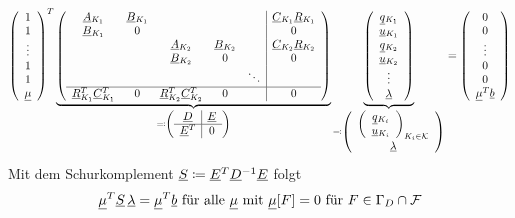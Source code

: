 \begin{align*}
\left(
\begin{array}{c}
1\\ 1 \\ \vdots \\ 1 \\ 1\\ \underline{\mu}{}
\end{array}
\right)^T
\underbrace{\left(
	\begin{array}{ccccc|c}
	\underline{A}{}_{K_1} & \underline{B}{}_{K_1}&&&& \underline{C}{}_{K_1} \underline{R}{}_{K_1}\\
	\underline{B}{}_{K_1} & 0 &&&& 0\\
	&& \underline{A}{}_{K_2} & \underline{B}{}_{K_2} && \underline{C}{}_{K_2} \underline{R}{}_{K_2}\\
	&  & \underline{B}{}_{K_2} & 0 && 0\\
	&  &  &  &\ddots &\\
	\hline
	\underline{R}{}_{K_1}^T \underline{C}{}_{K_1}^T& 0 & \underline{R}{}_{K_2}^T \underline{C}{}_{K_2}^T& 0& &0 \\
	\end{array}
	\right)}_{\eqqcolon \left( \begin{array}{c|c}
	\underline{D}{} & \underline{E}{}\\
	\hline
	\underline{E}{}^T & 0
	\end{array} \right)}
\underbrace{\left(
	\begin{array}{c}
	\underline{q}{}_{K_1}\\ \underline{u}{}_{K_1} \\ \underline{q}{}_{K_2}\\ \underline{u}{}_{K_2} \\ \vdots \\ \underline{\lambda}{}
	\end{array}
	\right)}_{\eqqcolon \left( \begin{array}{c}
	\left(
	\begin{array}{c}
	\underline{q}{}_{K_i}\\ \underline{u}{}_{K_i}
	\end{array}
	\right)_{K_i \in \mathcal{K}} \\ \underline{\lambda}{} 
	\end{array}\right)} = 
\left(
\begin{array}{c}
0\\ 0 \\ \vdots \\ 0 \\ 0\\ \underline{\mu}{}^T \underline{b}{}
\end{array}
\right)
\end{align*}
Mit dem Schurkomplement $ \underline{S}{} \coloneqq \underline{E}{}^T \underline{D}{}^{-1} \underline{E}{} $ folgt
\[ \underline{\mu}{}^T \underline{S}{} \, \underline{\lambda}{} = \underline{\mu}{}^T \underline{b}{} 	\text{ für alle } \underline{\mu}{} \text{ mit } \underline{\mu}{}[F] = 0 \text{ für } F \in \Gamma_D \cap \mathcal{F} \]

